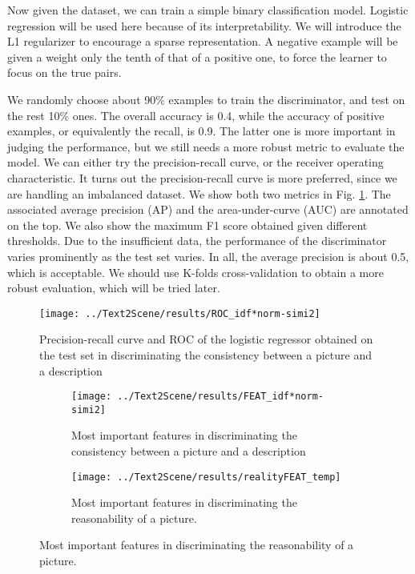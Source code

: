 \documentclass{article} %
\begin{document}
Now given the dataset, we can train a simple binary classification model. Logistic regression will be used here because of its interpretability. We will introduce the L1 regularizer to encourage a sparse representation. A negative example will be given a weight only the tenth of that of a positive one, to force the learner to focus on the true pairs. 

We randomly choose about 90\% examples to train the discriminator, and test on the rest 10\% ones. The overall accuracy is 0.4, while the accuracy of positive examples, or equivalently the recall, is 0.9. The latter one is more important in judging the performance, but we still needs a more robust metric to evaluate the model. We can either try the precision-recall curve, or the receiver operating characteristic. It turns out the precision-recall curve is more preferred, since we are handling an imbalanced dataset. We show both two metrics in Fig. \ref{fig: consistent-metric}. The associated average precision (AP) and the area-under-curve (AUC) are annotated on the top. We also show the maximum F1 score obtained given different thresholds. Due to the insufficient data, the performance of the discriminator varies prominently as the test set varies. In all, the average precision is about 0.5, which is acceptable. We should use K-folds cross-validation to obtain a more robust evaluation, which will be tried later. 

\begin{figure}[htbp]
	\centering
	\texttt{[image: ../Text2Scene/results/ROC\_idf*norm-simi2]}
	\caption{Precision-recall curve and ROC of the logistic regressor obtained on the test set in discriminating the consistency between a picture and a description}
	\label{fig: consistent-metric}
\end{figure}

\begin{figure}[htbp]
	\begin{subfigure}{0.5\linewidth}
		\centering
		\texttt{[image: ../Text2Scene/results/FEAT\_idf*norm-simi2]}
		\caption{Most important features in discriminating the consistency between a picture and a description}
		\label{fig: consistent-feat}
	\end{subfigure}
	\begin{subfigure}{0.48\linewidth}
		\centering
		\texttt{[image: ../Text2Scene/results/realityFEAT\_temp]}
		\caption{Most important features in discriminating the reasonability of a picture.}
		\label{fig: real-feat}
	\end{subfigure}
\end{figure}
\end{document}
